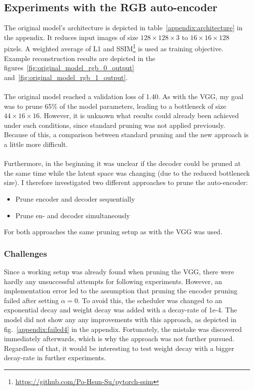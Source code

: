 \documentclass[10pt,twocolumn,letterpaper]{article}
\begin{document}
\subsection{Experiments with the RGB auto-encoder}
The original model's architecture is depicted in table~\ref{appendix:architecture} in the appendix.
It reduces input images of size $128\times128\times3$ to $16\times16\times128$ pixels.
A weighted average of L1 and SSIM\footnote{\url{https://github.com/Po-Hsun-Su/pytorch-ssim}} is used as training objective.
Example reconstruction results are depicted in the figures~\ref{fig:original_model_rgb_0_output} and~\ref{fig:original_model_rgb_1_output}.\\\\
The original model reached a validation loss of 1.40.
As with the VGG, my goal was to prune 65\% of the model parameters, leading to a bottleneck of size $44\times16\times16$.
However, it is unknown what results could already been achieved under such conditions, since standard pruning was not applied previously.
Because of this, a comparison between standard pruning and the new approach is a little more difficult.\\\\
Furthermore, in the beginning it was unclear if the decoder could be pruned at the same time while the latent space was changing (due to the reduced bottleneck size).
I therefore investigated two different approaches to prune the auto-encoder:
\begin{itemize}
	\item Prune encoder and decoder sequentially
	\item Prune en- and decoder simultaneously
\end{itemize}
For both approaches the same pruning setup as with the VGG was used.

\subsubsection{Challenges}
Since a working setup was already found when pruning the VGG, there were hardly any unsuccessful attempts for following experiments.
However, an implementation error led to the assumption that pruning the encoder pruning failed after setting $\alpha=0$.
To avoid this, the scheduler was changed to an exponential decay and weight decay was added with a decay-rate of 1e-4.
The model did not show any any improvements with this approach, as depicted in fig.~\ref{appendix:failed4} in the appendix.
Fortunately, the mistake was discovered immediately afterwards, which is why the approach was not further pursued.
Regardless of that, it would be interesting to test weight decay with a bigger decay-rate in further experiments.
\end{document}
